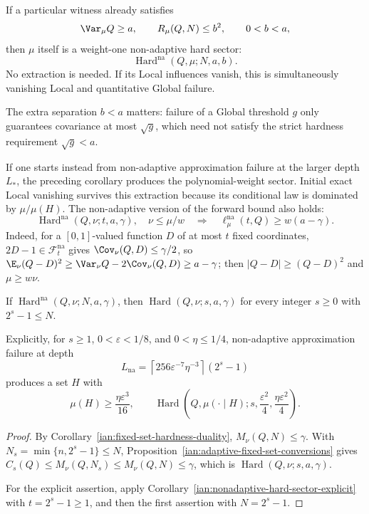 \begin{remark}
\label{ian:nonadaptive-extraction-from-gamma-failure}
If a particular witness already satisfies
\[
 \Var_\mu Q\ge a,\qquad
 R_\mu(Q,N)\le b^2,\qquad 0<b<a,
\]
then \(\mu\) itself is a weight-one non-adaptive hard sector:
\[
 \operatorname{Hard}^{\mathrm{na}}(Q,\mu;N,a,b).
\]
No extraction is needed. If its Local influences vanish, this is
simultaneously vanishing Local and quantitative Global failure.

The extra separation \(b<a\) matters: failure of a Global threshold
\(g\) only guarantees covariance at most \(\sqrt g\), which need
not satisfy the strict hardness requirement \(\sqrt g<a\).

If one starts instead from non-adaptive approximation failure at
the larger depth \(L_*\), the preceding corollary produces the
polynomial-weight sector. Initial exact Local vanishing survives
this extraction because its conditional law is dominated by
\(\mu/\mu(H)\). The non-adaptive version of the forward bound
also holds:
\[
 \operatorname{Hard}^{\mathrm{na}}(Q,\nu;t,a,\gamma),
 \quad \nu\le\mu/w
 \quad\Longrightarrow\quad
 \ell_\mu^{\mathrm{na}}(t,Q)\ge w(a-\gamma).
\]
Indeed, for a \([0,1]\)-valued function \(D\) of at most \(t\) fixed
coordinates, \(2D-1\in\mathcal F_t^{\mathrm{na}}\) gives
\(\Cov_\nu(Q,D)\le\gamma/2\), so
\(\E_\nu(Q-D)^2\ge\Var_\nu Q-2\Cov_\nu(Q,D)\ge a-\gamma\); then
\(|Q-D|\ge(Q-D)^2\) and \(\mu\ge w\nu\).
\end{remark}

\begin{proposition}
\label{ian:nonadaptive-to-adaptive-extraction-cost}
If \(\operatorname{Hard}^{\mathrm{na}}(Q,\nu;N,a,\gamma)\), then
\(\operatorname{Hard}(Q,\nu;s,a,\gamma)\) for every integer \(s\ge0\)
with \(2^s-1\le N\).

Explicitly, for \(s\ge1\), \(0<\varepsilon<1/8\), and
\(0<\eta\le1/4\), non-adaptive approximation failure at depth
\[
 L_{\mathrm{na}}
 =
 \left\lceil256\varepsilon^{-7}\eta^{-3}\right\rceil
 (2^s-1)
\]
produces a set \(H\) with
\[
 \mu(H)\ge\frac{\eta\varepsilon^3}{16},
 \qquad
 \operatorname{Hard}\left(
 Q,\mu(\cdot\mid H);
 s,\frac{\varepsilon^2}{4},
 \frac{\eta\varepsilon^2}{4}\right).
\]
\end{proposition}

\begin{proof}
By Corollary~\ref{ian:fixed-set-hardness-duality},
\(M_\nu(Q,N)\le\gamma\). With \(N_s=\min\{n,2^s-1\}\le N\),
Proposition~\ref{ian:adaptive-fixed-set-conversions} gives
\(C_s(Q)\le M_\nu(Q,N_s)\le M_\nu(Q,N)\le\gamma\), which is
\(\operatorname{Hard}(Q,\nu;s,a,\gamma)\).

For the explicit assertion, apply
Corollary~\ref{ian:nonadaptive-hard-sector-explicit} with
\(t=2^s-1\ge1\), and then the first assertion with \(N=2^s-1\).
\end{proof}

